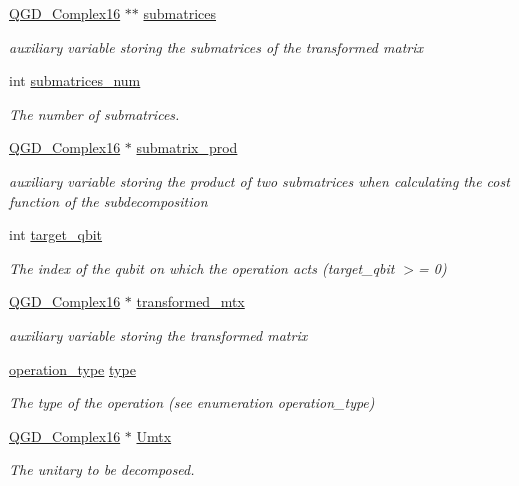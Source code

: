 \begin{DoxyCompactItemize}
\hyperlink{struct_q_g_d___complex16}{Q\+G\+D\+\_\+\+Complex16} $\ast$$\ast$ \hyperlink{class_sub___matrix___decomposition_ac0e3764e04bd296fb015cbba032aa4e4}{submatrices}
\begin{DoxyCompactList}\small\item\em auxiliary variable storing the submatrices of the transformed matrix \end{DoxyCompactList}\item 
int \hyperlink{class_sub___matrix___decomposition_a512831dd6b7f62fbfde10fb02dec3c5f}{submatrices\+\_\+num}
\begin{DoxyCompactList}\small\item\em The number of submatrices. \end{DoxyCompactList}\item 
\hyperlink{struct_q_g_d___complex16}{Q\+G\+D\+\_\+\+Complex16} $\ast$ \hyperlink{class_sub___matrix___decomposition_a47dd88c6f311dc24a3e0fa695a2c490e}{submatrix\+\_\+prod}
\begin{DoxyCompactList}\small\item\em auxiliary variable storing the product of two submatrices when calculating the cost function of the subdecomposition \end{DoxyCompactList}\item 
int \hyperlink{class_operation_a3e489b72c124b494777c71b1646bb1e9}{target\+\_\+qbit}
\begin{DoxyCompactList}\small\item\em The index of the qubit on which the operation acts (target\+\_\+qbit $>$= 0) \end{DoxyCompactList}\item 
\hyperlink{struct_q_g_d___complex16}{Q\+G\+D\+\_\+\+Complex16} $\ast$ \hyperlink{class_decomposition___base_ae6fa4013266ee6e702b7e645c6bbfed1}{transformed\+\_\+mtx}
\begin{DoxyCompactList}\small\item\em auxiliary variable storing the transformed matrix \end{DoxyCompactList}\item 
\hyperlink{operations_2include_2_operation_8h_ad99e62941c8e4b13e5fc45ecaaf65eff}{operation\+\_\+type} \hyperlink{class_operation_ad47c56c86d62a4c775571e1600416479}{type}
\begin{DoxyCompactList}\small\item\em The type of the operation (see enumeration operation\+\_\+type) \end{DoxyCompactList}\item 
\hyperlink{struct_q_g_d___complex16}{Q\+G\+D\+\_\+\+Complex16} $\ast$ \hyperlink{class_decomposition___base_a61a784aaba39276260b3f73709b51ccc}{Umtx}
\begin{DoxyCompactList}\small\item\em The unitary to be decomposed. \end{DoxyCompactList}\end{DoxyCompactItemize}



